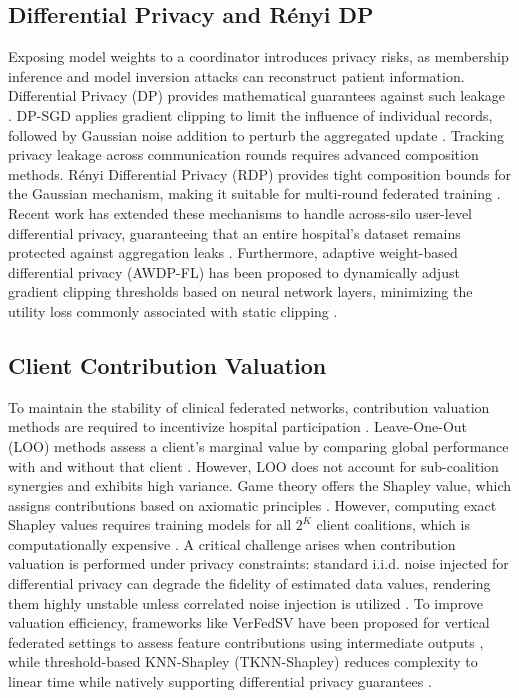 \documentclass[conference]{IEEEtran}
\begin{document}
\subsection{Differential Privacy and Rényi DP}
Exposing model weights to a coordinator introduces privacy risks, as membership inference and model inversion attacks can reconstruct patient information. Differential Privacy (DP) provides mathematical guarantees against such leakage \cite{Dwork2008DPSurvey, Dwork2006CalibratingNoise}. DP-SGD applies gradient clipping to limit the influence of individual records, followed by Gaussian noise addition to perturb the aggregated update \cite{Abadi2016DPSGD}. Tracking privacy leakage across communication rounds requires advanced composition methods. Rényi Differential Privacy (RDP) provides tight composition bounds for the Gaussian mechanism, making it suitable for multi-round federated training \cite{Mironov2017RDP, Mironov2019SampledGaussian}. Recent work has extended these mechanisms to handle across-silo user-level differential privacy, guaranteeing that an entire hospital's dataset remains protected against aggregation leaks \cite{Kato2024ULDP}. Furthermore, adaptive weight-based differential privacy (AWDP-FL) has been proposed to dynamically adjust gradient clipping thresholds based on neural network layers, minimizing the utility loss commonly associated with static clipping \cite{Chen2024AWDP}.

\subsection{Client Contribution Valuation}
To maintain the stability of clinical federated networks, contribution valuation methods are required to incentivize hospital participation \cite{Kazlouski2025HospitalParticipation, Wang2020ContributionSV}. Leave-One-Out (LOO) methods assess a client's marginal value by comparing global performance with and without that client \cite{Ghorbani2019DataShapley}. However, LOO does not account for sub-coalition synergies and exhibits high variance. Game theory offers the Shapley value, which assigns contributions based on axiomatic principles \cite{Jia2019KNNShapley, Ghorbani2020NeuronShapley}. However, computing exact Shapley values requires training models for all $2^K$ client coalitions, which is computationally expensive \cite{Lyu2020FairnessFL, Song2019BlockchainFL, Yan2021SelectionFL, Jia2020EfficientShapley}. A critical challenge arises when contribution valuation is performed under privacy constraints: standard i.i.d. noise injected for differential privacy can degrade the fidelity of estimated data values, rendering them highly unstable unless correlated noise injection is utilized \cite{Zhou2025Data}. To improve valuation efficiency, frameworks like VerFedSV have been proposed for vertical federated settings to assess feature contributions using intermediate outputs \cite{Fan2024VerFedSV}, while threshold-based KNN-Shapley (TKNN-Shapley) reduces complexity to linear time while natively supporting differential privacy guarantees \cite{wang2023threshold}.
\end{document}
